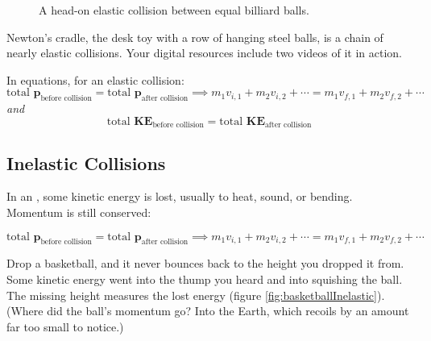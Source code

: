 \begin{figure}[H]
\begin{tikzpicture}[x=0.75pt,y=0.75pt,yscale=-1,xscale=1]
\end{tikzpicture}
    \caption{A head-on elastic collision between equal billiard balls.}
    \label{fig:billiardElasticCollision}
\end{figure}

Newton's cradle, the desk toy with a row of hanging steel balls, is a
chain of nearly elastic collisions. Your digital resources include two
videos of it in action.

In equations, for an elastic collision:
\[\text{total }\textbf{p}_{\text{before collision}} = \text{total }\textbf{p}_{\text{after collision}} \implies m_1v_{i,1} + m_2v_{i,2} + \cdots  = m_1v_{f,1} + m_2v_{f,2} + \cdots\]
\emph{and}
\[\text{total }\textbf{KE}_{\text{before collision}} = \text{total }\textbf{KE}_{\text{after collision}}\]

\subsection{Inelastic Collisions}
In an , some
kinetic energy is lost, usually to heat, sound, or bending. Momentum is
still conserved:

\[\text{total }\textbf{p}_{\text{before collision}} = \text{total }\textbf{p}_{\text{after collision}} \implies m_1v_{i,1} + m_2v_{i,2} + \cdots  = m_1v_{f,1} + m_2v_{f,2} + \cdots\]

Drop a basketball, and it never bounces back to the height you dropped
it from. Some kinetic energy went into the thump you heard and into
squishing the ball. The missing height measures the lost energy (figure
\ref{fig:basketballInelastic}). (Where did the ball's momentum go? Into the
Earth, which recoils by an amount far too small to notice.)


